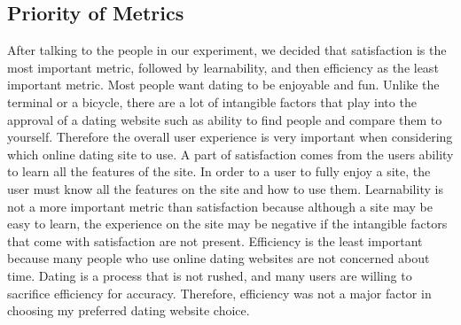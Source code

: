 \documentclass{article}
\begin{document}
\subsection{Priority of Metrics}
After talking to the people in our experiment, we decided that satisfaction is the most important metric, followed by learnability, and then efficiency as the least important metric. Most people want dating to be enjoyable and fun. Unlike the terminal or a bicycle, there are a lot of intangible factors that play into the approval of a dating website such as ability to find people and compare them to yourself. Therefore the overall user experience is very important when considering which online dating site to use. A part of satisfaction comes from the users ability to learn all the features of the site. In order to a user to fully enjoy a site, the user must know all the features on the site and how to use them. Learnability is not a more important metric than satisfaction because although a site may be easy to learn, the experience on the site may be negative if the intangible factors that come with satisfaction are not present. Efficiency is the least important because many people who use online dating websites are not concerned about time. Dating is a process that is not rushed, and many users are willing to sacrifice efficiency for accuracy. Therefore, efficiency was not a major factor in choosing my preferred dating website choice. 



\pagebreak
%
%
\end{document}
